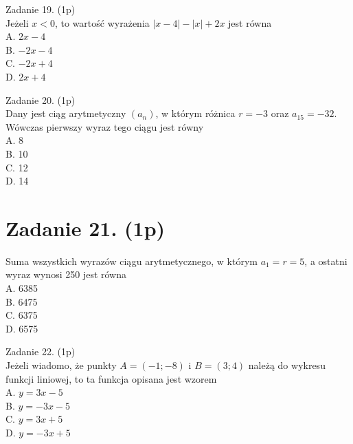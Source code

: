\documentclass[10pt]{article}
\begin{document}
Zadanie 19. (1p)\\
Jeżeli \(x<0\), to wartość wyrażenia \(|x-4|-|x|+2 x\) jest równa\\
A. \(2 x-4\)\\
B. \(-2 x-4\)\\
C. \(-2 x+4\)\\
D. \(2 x+4\)

Zadanie 20. (1p)\\
Dany jest ciąg arytmetyczny \(\left(a_{n}\right)\), w którym różnica \(r=-3\) oraz \(a_{15}=-32\). Wówczas pierwszy wyraz tego ciągu jest równy\\
A. 8\\
B. 10\\
C. 12\\
D. 14

\section*{Zadanie 21. (1p)}
Suma wszystkich wyrazów ciągu arytmetycznego, w którym \(a_{1}=r=5\), a ostatni wyraz wynosi 250 jest równa\\
A. 6385\\
B. 6475\\
C. 6375\\
D. 6575

Zadanie 22. (1p)\\
Jeżeli wiadomo, że punkty \(A=(-1 ;-8)\) i \(B=(3 ; 4)\) należą do wykresu funkcji liniowej, to ta funkcja opisana jest wzorem\\
A. \(y=3 x-5\)\\
B. \(y=-3 x-5\)\\
C. \(y=3 x+5\)\\
D. \(y=-3 x+5\)
\end{document}
